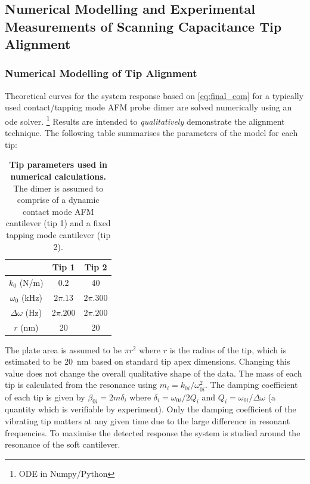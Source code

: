 \documentclass{article}
\begin{document}
\subsection{Numerical Modelling and Experimental Measurements of Scanning Capacitance Tip Alignment}

\subsubsection{Numerical Modelling of Tip Alignment}

Theoretical curves for the system response based on \eqref{eq:final_eom} for a typically used contact/tapping mode AFM probe dimer are solved numerically using an \gls{ode} solver.%
\footnote{ODE in Numpy/Python}
Results are intended to \textit{qualitatively} demonstrate the alignment technique.
The following table summarises the parameters of the model for each tip:
\begin{table}[H]
\begin{center}
\begin{tabular}{c | c | c}
\hline
& \textbf{Tip 1} & \textbf{Tip 2} \\
\hline                 
$k_0$ (N/m) & 0.2 & 40 \\
$\omega_0$ (kHz) & $2\pi.13$ & $2\pi.300$ \\
$\Delta\omega$ (Hz) & $2\pi.200$ & $2\pi.200$ \\
$r$ (nm) & 20 & 20 \\
\hline 
\end{tabular}
\end{center}
\caption[Tip parameters used in numerical calculations]{\textbf{Tip parameters used in numerical calculations.} The dimer is assumed to comprise of a dynamic contact mode AFM cantilever (tip 1) and a fixed tapping mode cantilever (tip 2).}
\vspace{-10pt}
\end{table}
The plate area is assumed to be $\pi r^2$ where $r$ is the radius of the tip, which is estimated to be \SI{20}{nm} based on standard tip apex dimensions. Changing this value does not change the overall qualitative shape of the data. The mass of each tip is calculated from the resonance using $m_i = k_{0i}/\omega_{0i}^2$. The damping coefficient of each tip is given by $\beta_{0i} = 2m\delta_i$ where $\delta_i = \omega_{0i}/2Q_i$ and $Q_i = \omega_{0i}/\Delta\omega$ (a quantity which is verifiable by experiment). Only the damping coefficient of the vibrating tip matters at any given time due to the large difference in resonant frequencies. To maximise the detected response the system is studied around the resonance of the soft cantilever.
\end{document}
